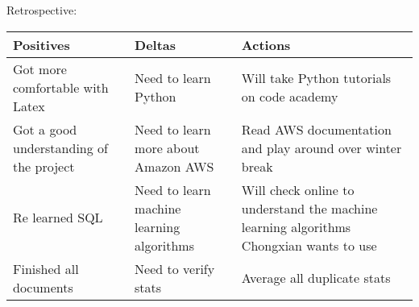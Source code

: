 \documentclass[letterpaper, 10pt,titlepage]{article}
\begin{document}
Retrospective:
\begin{center}
    \begin{tabular}{ | l | l | p{3cm} |}
    \hline
    Positives & Deltas & Actions \\ \hline
    Got more comfortable with Latex & Need to learn Python & Will take Python tutorials on code academy \\ \hline
    Got a good understanding of the project & Need to learn more about Amazon AWS & Read AWS documentation and play around over winter break \\ \hline
    Re learned SQL & Need to learn machine learning algorithms & Will check online to understand the machine learning algorithms Chongxian wants to use \\ \hline
    Finished all documents & Need to verify stats & Average all duplicate stats \\ \hline
    \end{tabular}
\end{center}
\end{document}

